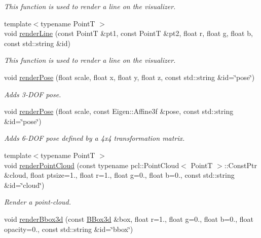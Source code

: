 \begin{DoxyCompactItemize}
\begin{DoxyCompactList}\small\item\em This function is used to render a line on the visualizer. \end{DoxyCompactList}\item 
{\footnotesize template$<$typename PointT $>$ }\\void \hyperlink{classtapl_1_1viz_1_1Visualizer_a23442f9881a361b9ff0aff3b18f1eea0}{render\+Line} (const PointT \&pt1, const PointT \&pt2, float r, float g, float b, const std\+::string \&id)
\begin{DoxyCompactList}\small\item\em This function is used to render a line on the visualizer. \end{DoxyCompactList}\item 
void \hyperlink{classtapl_1_1viz_1_1Visualizer_a22497fa3f1d2738c1b0a3f963a7c43dd}{render\+Pose} (float scale, float x, float y, float z, const std\+::string \&id=\char`\"{}pose\char`\"{})
\begin{DoxyCompactList}\small\item\em Adds 3-\/\+D\+OF pose. \end{DoxyCompactList}\item 
void \hyperlink{classtapl_1_1viz_1_1Visualizer_ae24ff2fab8c5107d931cd175abd916ef}{render\+Pose} (float scale, const Eigen\+::\+Affine3f \&pose, const std\+::string \&id=\char`\"{}pose\char`\"{})
\begin{DoxyCompactList}\small\item\em Adds 6-\/\+D\+OF pose defined by a 4x4 transformation matrix. \end{DoxyCompactList}\item 
{\footnotesize template$<$typename PointT $>$ }\\void \hyperlink{classtapl_1_1viz_1_1Visualizer_a5c6a85b27b5042f09b0e7034ee73209c}{render\+Point\+Cloud} (const typename pcl\+::\+Point\+Cloud$<$ PointT $>$\+::Const\+Ptr \&cloud, float ptsize=1., float r=1., float g=0., float b=0., const std\+::string \&id=\char`\"{}cloud\char`\"{})
\begin{DoxyCompactList}\small\item\em Render a point-\/cloud. \end{DoxyCompactList}\item 
void \hyperlink{classtapl_1_1viz_1_1Visualizer_a3915205a2348669a0399b3f1a2e8551c}{render\+Bbox3d} (const \hyperlink{structtapl_1_1BBox3d}{B\+Box3d} \&box, float r=1., float g=0., float b=0., float opacity=0., const std\+::string \&id=\char`\"{}bbox\char`\"{})

\end{DoxyCompactItemize}

